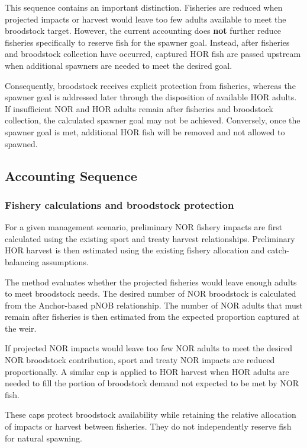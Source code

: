 \documentclass[12pt,letterpaper]{article}
\begin{document}
This sequence contains an important distinction. Fisheries are reduced when projected impacts or harvest would leave too few adults available to meet the broodstock target. However, the current accounting does \textbf{not} further reduce fisheries specifically to reserve fish for the spawner goal. Instead, after fisheries and broodstock collection have occurred, captured HOR fish are passed upstream when additional spawners are needed to meet the desired goal.

Consequently, broodstock receives explicit protection from fisheries, whereas the spawner goal is addressed later through the disposition of available HOR adults. If insufficient NOR and HOR adults remain after fisheries and broodstock collection, the calculated spawner goal may not be achieved. Conversely, once the spawner goal is met, additional HOR fish will be removed and not allowed to spawned.

\subsection{Accounting Sequence}\label{accounting-sequence}

\subsubsection{Fishery calculations and broodstock protection}\label{fishery-calculations-and-broodstock-protection}

For a given management scenario, preliminary NOR fishery impacts are first calculated using the existing sport and treaty harvest relationships. Preliminary HOR harvest is then estimated using the existing fishery allocation and catch-balancing assumptions.

The method evaluates whether the projected fisheries would leave enough adults to meet broodstock needs. The desired number of NOR broodstock is calculated from the Anchor-based pNOB relationship. The number of NOR adults that must remain after fisheries is then estimated from the expected proportion captured at the weir.

If projected NOR impacts would leave too few NOR adults to meet the desired NOR broodstock contribution, sport and treaty NOR impacts are reduced proportionally. A similar cap is applied to HOR harvest when HOR adults are needed to fill the portion of broodstock demand not expected to be met by NOR fish.

These caps protect broodstock availability while retaining the relative allocation of impacts or harvest between fisheries. They do not independently reserve fish for natural spawning.
\end{document}
